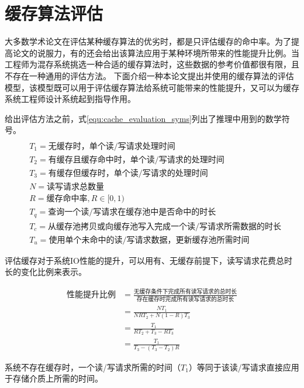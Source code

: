 \section{缓存算法评估}
\label{sec:cache_evaluation}

大多数学术论文在评估某种缓存算法的优劣时，都是只评估缓存的命中率。为了提高论文的说服力，有的还会给出该算法应用于某种环境所带来的性能提升比例。当工程师为混存系统挑选一种合适的缓存算法时，这些数据的参考价值都很有限，且不存在一种通用的评估方法。
下面介绍一种本论文提出并使用的缓存算法的评估模型，该模型既可以用于评估缓存算法给系统可能带来的性能提升，又可以为缓存系统工程师设计系统起到指导作用。

给出评估方法之前，式\ref{equ:cache_evaluation_syms}列出了推理中用到的数学符号。
\begin{equation}
\begin{split}
\\&T_1=\mbox{无缓存时，单个读/写请求处理时间}
\\&T_2=\mbox{有缓存且缓存命中时，单个读/写请求的处理时间}
\\&T_3=\mbox{有缓存但缓存时，单个读/写请求的处理时间}
\\&N=\mbox{读写请求总数量}
\\&R=\mbox{缓存命中率},R\in\lbrack0,1)
\\&T_q=\mbox{查询一个读/写请求在缓存池中是否命中的时长}
\\&T_c=\mbox{从缓存池拷贝或向缓存池写入完成一个读/写请求所需数据的时长}
\\&T_u=\mbox{使用单个未命中的读/写请求数据，更新缓存池所需时间}
\end{split}
\label{equ:cache_evaluation_syms}
\end{equation}

评估缓存对于系统IO性能的提升，可以用有、无缓存前提下，读写请求花费总时长的变化比例来表示。

\begin{equation}
\begin{split}
\mbox{性能提升比例}&=\frac{\mbox{无缓存条件下完成所有读写请求的总时长}}{\mbox{存在缓存时完成所有读写请求的总时长}}
\\&=\frac{NT_1}{NRT_2+N(1-R)T_3}
\\&=\frac{T_1}{RT_2+T_3-RT_3}
\\&=\frac{T_1}{T_3-(T_3-T_2)R}
\end{split}
\label{equ:cache_evaluation_enhance1}
\end{equation}

系统不存在缓存时，一个读/写请求所需的时间（$T_1$）等同于该读/写请求直接应用于存储介质上所需的时间。

